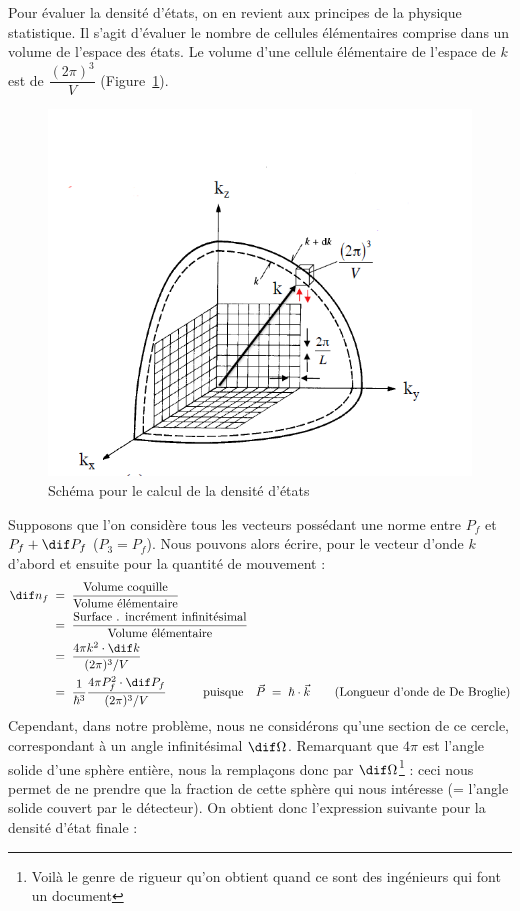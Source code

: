Pour évaluer la densité d'états, on en revient aux principes de la physique statistique. Il s'agit d'évaluer le nombre de cellules élémentaires comprise dans un volume de l'espace des états. Le volume d'une cellule élémentaire de l'espace de $k$ est de $\dfrac{(2\pi)^3}{V}$ (Figure~\ref{fig:densite_etats}).
 \begin{figure}[htpb]
    \centering
    \includegraphics[scale=0.80]{Images4/dens.PNG}
    \caption{Schéma pour le calcul de la densité d'états}
    \label{fig:densite_etats}
\end{figure}
Supposons que l'on considère tous les vecteurs possédant une norme entre $P_f$ et $P_f + \dif P_f$ ($P_3 = P_f$). Nous pouvons alors écrire, pour le vecteur d'onde $k$ d'abord et ensuite pour la quantité de mouvement :
\begin{align*}
    \dif n_f 
        &\eq 
    \dfrac{\text{Volume coquille}}{\text{Volume élémentaire}}\\
        &\eq
    \dfrac{\text{Surface . incrément infinitésimal}}{\text{Volume élémentaire}}\\
        &\eq
    \dfrac{4\pi k^2 \cdot \dif k}{(2\pi)^3 / V}\\
        &\eq
    \dfrac{1}{\hbar^3}\dfrac{4\pi P^{2}_f \cdot \dif P_f}{(2\pi)^3 / V} 
    \qquad \quad \text{puisque} \quad
    \vec{P} \eq \hbar \cdot \vec{k} \qquad \text{(Longueur d'onde de De Broglie)}
\end{align*}
Cependant, dans notre problème, nous ne considérons qu'une section de ce cercle, correspondant à un angle infinitésimal $\dif\Omega$. Remarquant que $4\pi$ est l'angle solide d'une sphère entière, nous la remplaçons donc par $\dif\Omega$\footnote{Voilà le genre de rigueur qu'on obtient quand ce sont des ingénieurs qui font un document} : ceci nous permet de ne prendre que la fraction de cette sphère qui nous intéresse (= l'angle solide couvert par le détecteur). On obtient donc l'expression suivante pour la densité d'état finale : 
